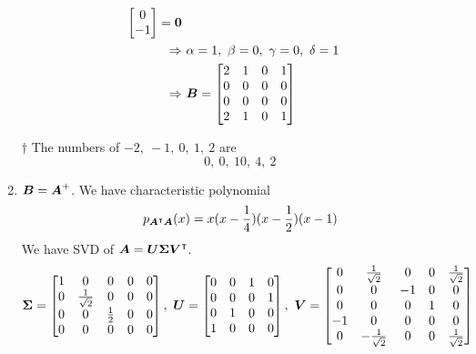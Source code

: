 \documentclass[a4paper,12pt]{article}
\begin{document}
\begin{enumerate}
\begin{equation}
\begin{aligned}
\begin{bmatrix}
				0 \\
				-1
			\end{bmatrix} = \vec{0} \\
			\Rightarrow & \ \alpha = 1, \ \beta = 0, \ \gamma = 0, \ \delta = 1 \\
			\Rightarrow & \ \mat{B} = \begin{bmatrix}
				2 & 1 & 0 & 1 \\
				0 & 0 & 0 & 0 \\
				0 & 0 & 0 & 0 \\
				2 & 1 & 0 & 1
			\end{bmatrix}
		\end{aligned}
	\end{equation}
	\begin{answer}{$\dag$} The numbers of $-2, \ -1, \ 0, \ 1, \ 2$ are \begin{equation}
			0, \ 0, \ 10, \ 4, \ 2
		\end{equation}
	\end{answer}
	\item $\boldsymbol{B} = \boldsymbol{A}^{+}$. We have characteristic polynomial \begin{equation}
		p_{\boldsymbol{A}^\intercal\boldsymbol{A}}(x) = x(x - \frac{1}{4})(x - \frac{1}{2})(x - 1)
	\end{equation} We have SVD of $\boldsymbol{A} = \boldsymbol{U}\boldsymbol{\Sigma}\boldsymbol{V}^\intercal$. \begin{equation}
		\boldsymbol{\Sigma} = \begin{bmatrix}
			1 & 0 & 0 & 0 & 0 \\
			0 & \frac{1}{\sqrt{2}} & 0 & 0 & 0 \\
			0 & 0 & \frac{1}{2} & 0 & 0 \\
			0 & 0 & 0 & 0 & 0 \\
		\end{bmatrix}, \ \boldsymbol{U} = \begin{bmatrix}
			0 & 0 & 1 & 0 \\
			0 & 0 & 0 & 1 \\
			0 & 1 & 0 & 0 \\
			1 & 0 & 0 & 0
		\end{bmatrix}, \ \boldsymbol{V} = \begin{bmatrix}
			0 & \frac{1}{\sqrt{2}} & 0 & 0 & \frac{1}{\sqrt{2}} \\
			0 & 0 & -1 & 0 & 0 \\
			0 & 0 & 0 & 1 & 0 \\
			-1 & 0 & 0 & 0 & 0 \\
			0 & -\frac{1}{\sqrt{2}} & 0 & 0 & \frac{1}{\sqrt{2}}

\end{bmatrix}
\end{equation}
\end{enumerate}
\end{document}
